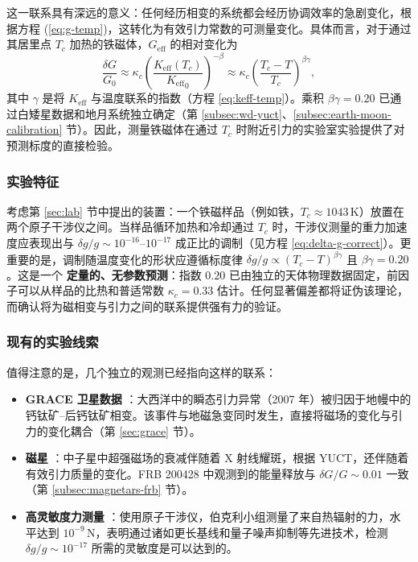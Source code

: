 \documentclass[12pt]{article}
\theoremstyle{remark}
\newcommand{\Keff}{K_{\mathrm{eff}}}
\begin{document}
	这一联系具有深远的意义：任何经历相变的系统都会经历协调效率的急剧变化，根据方程 (\ref{eq:g-temp})，这转化为有效引力常数的可测量变化。具体而言，对于通过其居里点 $T_c$ 加热的铁磁体，$G_{\mathrm{eff}}$ 的相对变化为
	\[
	\frac{\delta G}{G_0} \approx \kappa_c \left( \frac{\Keff(T_c)}{{\Keff}_{0}} \right)^{-\beta} \approx \kappa_c \left( \frac{T_c - T}{T_c} \right)^{\beta\gamma},
	\]
	其中 $\gamma$ 是将 $\Keff$ 与温度联系的指数（方程 \ref{eq:keff-temp}）。乘积 $\beta\gamma = 0.20$ 已通过白矮星数据和地月系统独立确定（第 \ref{subsec:wd-yuct}、\ref{subsec:earth-moon-calibration} 节）。因此，测量铁磁体在通过 $T_c$ 时附近引力的实验室实验提供了对预测标度的直接检验。
	
	\subsubsection{实验特征}
	考虑第 \ref{sec:lab} 节中提出的装置：一个铁磁样品（例如铁，$T_c \approx 1043\,\mathrm{K}$）放置在两个原子干涉仪之间。当样品循环加热和冷却通过 $T_c$ 时，干涉仪测量的重力加速度应表现出与 $\delta g/g \sim 10^{-16}$–$10^{-17}$ 成正比的调制（见方程 \ref{eq:delta-g-correct}）。更重要的是，调制随温度变化的形状应遵循标度律 $\delta g/g \propto (T_c - T)^{\beta\gamma}$ 且 $\beta\gamma = 0.20$。这是一个 \textbf{定量的、无参数预测}：指数 $0.20$ 已由独立的天体物理数据固定，前因子可以从样品的比热和普适常数 $\kappa_c = 0.33$ 估计。任何显著偏差都将证伪该理论，而确认将为磁相变与引力之间的联系提供强有力的验证。
	
	\subsubsection{现有的实验线索}
	值得注意的是，几个独立的观测已经指向这样的联系：
	\begin{itemize}
		\item \textbf{GRACE 卫星数据} \cite{Rosat2025}：大西洋中的瞬态引力异常（2007 年）被归因于地幔中的钙钛矿–后钙钛矿相变。该事件与地磁急变同时发生，直接将磁场的变化与引力的变化耦合（第 \ref{sec:grace} 节）。
		\item \textbf{磁星} \cite{Kaspi2017}：中子星中超强磁场的衰减伴随着 X 射线耀斑，根据 YUCT，还伴随着有效引力质量的变化。FRB 200428 中观测到的能量释放与 $\delta G/G \sim 0.01$ 一致（第 \ref{subsec:magnetars-frb} 节）。
		\item \textbf{高灵敏度力测量} \cite{Muller2017}：使用原子干涉仪，伯克利小组测量了来自热辐射的力，水平达到 $10^{-9}\,\mathrm{N}$，表明通过诸如更长基线和量子噪声抑制等先进技术，检测 $\delta g/g \sim 10^{-17}$ 所需的灵敏度是可以达到的。
	\end{itemize}
	
\end{document}
